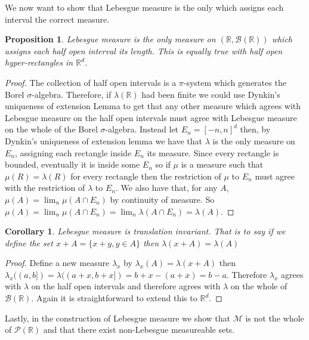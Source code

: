 \documentclass[
]{book}
\newtheorem{corollary}{Corollary}[chapter]
\newtheorem{proposition}{Proposition}[chapter]
\theoremstyle{definition}
\theoremstyle{definition}
\theoremstyle{definition}
\theoremstyle{definition}
\theoremstyle{remark}
\begin{document}
We now want to show that Lebesgue measure is the only which assigns each interval the correct measure.

\begin{proposition}
Lebesgue measure is the only measure on \((\mathbb{R}, \mathcal{B}(\mathbb{R}))\) which assigns each half open interval its length. This is equally true with half open hyper-rectangles in \(\mathbb{R}^d\).
\end{proposition}

\begin{proof}
The collection of half open intervals is a \(\pi\)-system which generates the Borel \(\sigma\)-algebra. Therefore, if \(\lambda(\mathbb{R})\) had been finite we could use Dynkin's uniqueness of extension Lemma to get that any other measure which agrees with Lebesgue measure on the half open intervals must agree with Lebesgue measure on the whole of the Borel \(\sigma\)-algebra. Instead let \(E_n = [-n,n]^d\) then, by Dynkin's uniqueness of extension lemma we have that \(\lambda\) is the only measure on \(E_n\), assigning each rectangle inside \(E_n\) its measure. Since every rectangle is bounded, eventually it is inside some \(E_n\) so if \(\mu\) is a measure such that \(\mu(R) = \lambda(R)\) for every rectangle then the restriction of \(\mu\) to \(E_n\) must agree with the restriction of \(\lambda\) to \(E_n\). We also have that, for any \(A\), \(\mu(A) = \lim_n \mu(A \cap E_n)\) by continuity of measure. So \(\mu(A) = \lim_n \mu(A\cap E_n) = \lim_n \lambda(A \cap E_n) = \lambda(A)\).
\end{proof}

\begin{corollary}
Lebesgue measure is translation invariant. That is to say if we define the set \(x+A = \{ x+y, y \in A\}\) then \(\lambda(x+A) = \lambda(A)\)
\end{corollary}

\begin{proof}
Define a new measure \(\lambda_x\) by \(\lambda_x(A) = \lambda(x+A)\) then \(\lambda_x((a,b]) = \lambda((a+x,b+x]) = b+x -(a+x) = b-a\). Therefore \(\lambda_x\) agrees with \(\lambda\) on the half open intervals and therefore agrees with \(\lambda\) on the whole of \(\mathcal{B}(\mathbb{R})\). Again it is straightforward to extend this to \(\mathbb{R}^d\).
\end{proof}

Lastly, in the construction of Lebesgue measure we show that \(\mathscr{M}\) is not the whole of \(\mathscr{P}(\mathbb{R})\) and that there exist non-Lebesgue measureable sets.
\end{document}
